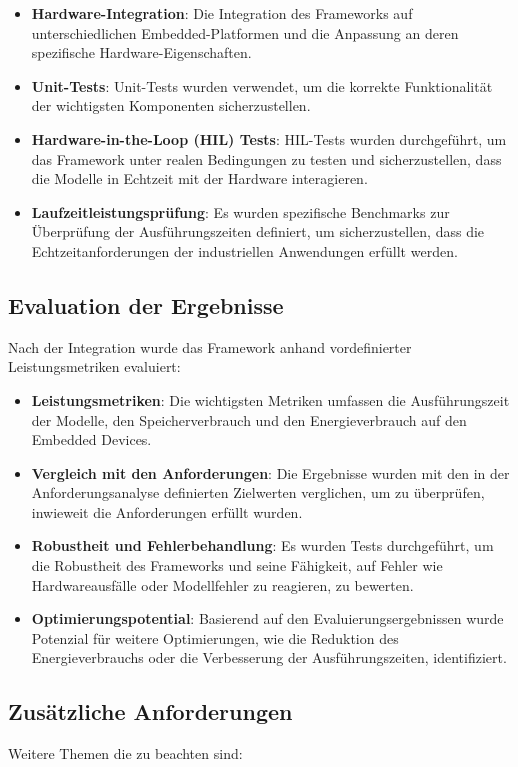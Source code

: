 \begin{itemize}
    \item \textbf{Hardware-Integration}: Die Integration des Frameworks auf unterschiedlichen Embedded-Platformen und die Anpassung an deren spezifische 
    Hardware-Eigenschaften.
    \item \textbf{Unit-Tests}: Unit-Tests wurden verwendet, um die korrekte Funktionalität der wichtigsten Komponenten sicherzustellen.
    \item \textbf{Hardware-in-the-Loop (HIL) Tests}: HIL-Tests wurden durchgeführt, um das Framework unter realen Bedingungen zu testen und sicherzustellen, 
    dass die Modelle in Echtzeit mit der Hardware interagieren.
    \item \textbf{Laufzeitleistungsprüfung}: Es wurden spezifische Benchmarks zur Überprüfung der Ausführungszeiten definiert, um sicherzustellen, 
    dass die Echtzeitanforderungen der industriellen Anwendungen erfüllt werden.
\end{itemize}

\subsection{Evaluation der Ergebnisse}
Nach der Integration wurde das Framework anhand vordefinierter Leistungsmetriken evaluiert:

\begin{itemize}
    \item \textbf{Leistungsmetriken}: Die wichtigsten Metriken umfassen die Ausführungszeit der Modelle, den Speicherverbrauch und den Energieverbrauch 
    auf den Embedded Devices.
    \item \textbf{Vergleich mit den Anforderungen}: Die Ergebnisse wurden mit den in der Anforderungsanalyse definierten Zielwerten verglichen, um zu überprüfen, 
    inwieweit die Anforderungen erfüllt wurden.
    \item \textbf{Robustheit und Fehlerbehandlung}: Es wurden Tests durchgeführt, um die Robustheit des Frameworks und seine Fähigkeit, auf Fehler wie 
    Hardwareausfälle oder Modellfehler zu reagieren, zu bewerten.
    \item \textbf{Optimierungspotential}: Basierend auf den Evaluierungsergebnissen wurde Potenzial für weitere Optimierungen, wie die Reduktion des 
    Energieverbrauchs oder die Verbesserung der Ausführungszeiten, identifiziert.
\end{itemize}

\subsection{Zusätzliche Anforderungen}
Weitere Themen die zu beachten sind:

